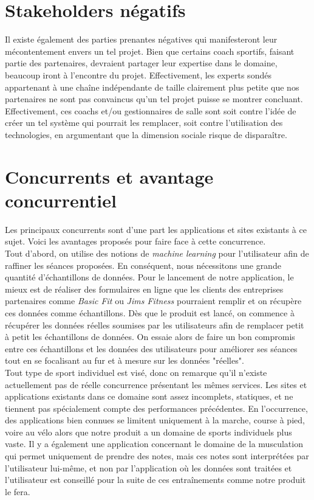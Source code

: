 \section{Stakeholders négatifs}

Il existe également des parties prenantes négatives qui manifesteront leur mécontentement envers un tel projet. Bien que certains coach sportifs, faisant partie des partenaires, devraient partager leur expertise dans le domaine, beaucoup iront à l'encontre du projet. Effectivement, les experts sondés appartenant à une chaîne indépendante de taille clairement plus petite que nos partenaires ne sont pas convaincus qu'un tel projet puisse se montrer concluant.\\

Effectivement, ces coachs et/ou gestionnaires de salle sont soit contre l'idée de créer un tel système qui pourrait les remplacer, soit contre l'utilisation des technologies, en argumentant que la dimension sociale risque de disparaître. 

\section{Concurrents et avantage concurrentiel}

Les principaux concurrents sont d'une part les applications et sites existants à ce sujet. Voici les avantages proposés pour faire face à cette concurrence.\\

Tout d'abord, on utilise des notions de \textit{machine learning} pour l'utilisateur afin de raffiner les séances proposées. En conséquent,  nous nécessitons une grande quantité d'échantillons de données. Pour le lancement de notre application, le mieux est de réaliser des formulaires en ligne que les clients des entreprises partenaires comme \textit{Basic Fit} ou \textit{Jims Fitness} pourraient remplir et on récupère ces données comme échantillons. Dès que le produit est lancé, on commence à récupérer les données réelles soumises par les utilisateurs afin de remplacer petit à petit les échantillons de données. On essaie alors de faire un bon compromis entre ces échantillons et les données des utilisateurs pour améliorer ses séances tout en se focalisant au fur et à mesure sur les données "réelles".\\

Tout type de sport individuel est visé, donc on remarque qu'il n'existe actuellement pas de réelle concurrence présentant les mêmes services. Les sites et applications existants dans ce domaine sont assez incomplets, statiques, et ne tiennent pas spécialement compte des performances précédentes. En l'occurrence, des applications bien connues se limitent uniquement à la marche, course à pied, voire au vélo alors que notre produit a un domaine de sports individuels plus vaste. Il y a également une application concernant le domaine de la musculation qui permet uniquement de prendre des notes, mais ces notes sont interprétées par l'utilisateur lui-même, et non par l'application où les données sont traitées et l'utilisateur est conseillé pour la suite de ces entraînements comme notre produit le fera.\\


